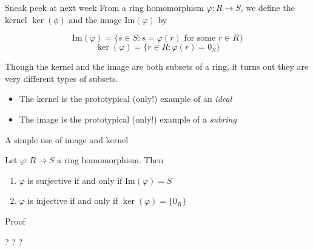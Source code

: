 \documentclass{beamer}
\begin{document}
\begin{frame}{Sneak peek at next week}
  From a ring homomorphism $\varphi:R\to S$, we define the kernel $\ker(\phi)$ and the image $\text{Im}(\varphi)$ by

  $$\text{Im}(\varphi)=\{s\in S : s=\varphi(r) \text{ for some } r\in R\}$$
    $$\ker(\varphi)=\{r\in R : \varphi(r)=0_S\}$$
  

Though the kernel and the image are both subsets of a ring, it turns out they are very different types of subsets.

\begin{itemize}
\item The kernel is the prototypical (only!) example of an \emph{ideal}
  \item The image is the prototypical (only!) example of a \emph{subring}
\end{itemize}
\end{frame}


\begin{frame}{A simple use of image and kernel}


  \begin{lemma} Let $\varphi:R\to S$ a ring homomorphism.  Then

    \begin{enumerate}
    \item $\varphi$ is surjective if and only if $\text{Im}(\varphi)=S$
      \item $\varphi$ is injective if and only if $\ker(\varphi)=\{0_R\}$
      \end{enumerate}
\end{lemma}

\begin{block}{Proof}
\begin{center} ? ? ? \end{center}
\end{block}  
  \end{frame}
\end{document}
